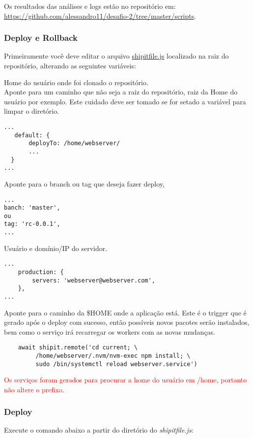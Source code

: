 Os resultados das análises e logs estão no repositório em:\\
\href{https://github.com/alessandro11/desafio-2/tree/master/scripts}{https://github.com/alessandro11/desafio-2/tree/master/scripts}.


\subsubsection{Deploy e Rollback}
Primeiramente você deve editar o arquivo
\href{https://github.com/alessandro11/desafio-2/blob/master/shipitfile.js}{shipitfile.js}
localizado na raiz do repositório, alterando as seguintes variáveis:

Home do usuário onde foi clonado o repositório.\\

\color{red}
Aponte para um caminho que não seja a raiz do repositório,
raiz da Home do usuário por exemplo. Este cuidado deve ser tomado se
for setado a variável para limpar o diretório.

\color{black}
\begin{verbatim}
...
   default: {
       deployTo: /home/webserver/
       ...
  }
...
\end{verbatim}

Aponte para o branch ou tag que deseja fazer deploy,
\begin{verbatim}
...
banch: 'master',
ou
tag: 'rc-0.0.1',
...
\end{verbatim}

Usuário e domínio/IP do servidor.
\begin{verbatim}
...
    production: {
        servers: 'webserver@webserver.com',
    },
...
\end{verbatim}

Aponte para o caminho da \$HOME onde a aplicação está. Este é o
trigger que é gerado após o deploy com sucesso, então possíveis novos
pacotes serão instalados, bem como o serviço irá recarregar os workers
com as novas mudanças.
\begin{verbatim}
    await shipit.remote('cd current; \
         /home/webserver/.nvm/nvm-exec npm install; \
         sudo /bin/systemctl reload webserver.service')
\end{verbatim}

\textcolor{red}{Os serviços foram gerados para procurar a home do
  usuário em /home, portanto não altere o prefixo.}

\subsubsection{Deploy}
Execute o comando abaixo a partir do diretório do
\emph{shipitfile.js}:

